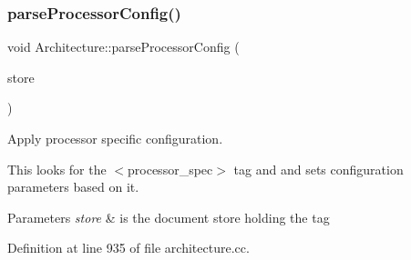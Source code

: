 \subsubsection{\texorpdfstring{parseProcessorConfig()}{parseProcessorConfig()}}
{\footnotesize\ttfamily void Architecture\+::parse\+Processor\+Config (\begin{DoxyParamCaption}\item[{\mbox{\hyperlink{class_document_storage}{Document\+Storage}} \&}]{store }\end{DoxyParamCaption})\hspace{0.3cm}{\ttfamily [protected]}}



Apply processor specific configuration. 

This looks for the $<$processor\+\_\+spec$>$ tag and and sets configuration parameters based on it. 
\begin{DoxyParams}{Parameters}
{\em store} & is the document store holding the tag \\
\hline
\end{DoxyParams}


Definition at line 935 of file architecture.\+cc.

